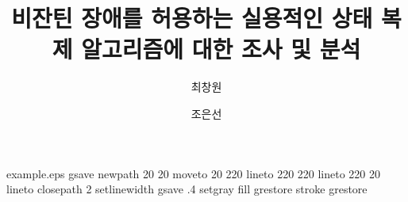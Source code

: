 %
%
%
%
%
\begin{filecontents*}{example.eps}
gsave
newpath
  20 20 moveto
  20 220 lineto
  220 220 lineto
  220 20 lineto
closepath
2 setlinewidth
gsave
  .4 setgray fill
grestore
stroke
grestore
\end{filecontents*}
%
\RequirePackage{fix-cm}
%
\documentclass[smallextended]{svjour3}       %
%
\usepackage{kotex}                           %

\smartqed  %
%
\usepackage{graphicx}
%
%
%
%
%



\title{비잔틴 장애를 허용하는 실용적인 상태 복제 알고리즘에 대한 조사 및 분석%
}


\author{최창원         \and
        조은선 %
}

